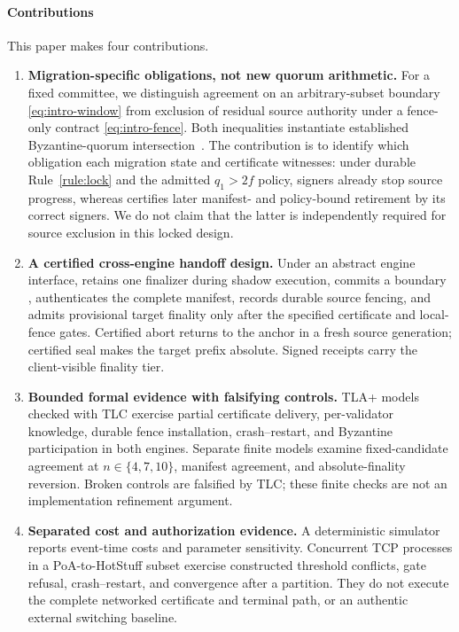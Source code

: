 \paragraph{Contributions}
This paper makes four contributions.
\begin{enumerate}[leftmargin=*,label=\textbf{C\arabic*.}]
  \item \textbf{Migration-specific obligations, not new quorum arithmetic.} For a fixed committee,
  we distinguish agreement on an arbitrary-subset boundary \eqref{eq:intro-window} from exclusion
  of residual source authority under a fence-only contract \eqref{eq:intro-fence}. Both inequalities
  instantiate established Byzantine-quorum intersection~\cite{byzantinequorums}. The contribution
  is to identify which obligation each migration state and certificate witnesses: under durable
  Rule~\ref{rule:lock} and the admitted $q_1>2f$ policy, \CutCert{} signers already stop source
  progress, whereas \FenceCert{} certifies later manifest- and policy-bound retirement by its
  correct signers. We do not claim that the latter is independently required for source exclusion
  in this locked design.
  \item \textbf{A certified cross-engine handoff design.} Under an abstract engine interface,
  \sage{} retains one finalizer during shadow execution, commits a boundary \CutCert{},
  authenticates the complete manifest, records durable source fencing, and admits provisional
  target finality only after the specified certificate and local-fence gates. Certified abort
  returns to the anchor in a fresh source generation; certified seal makes the target prefix
  absolute. Signed receipts carry the client-visible finality tier.
  \item \textbf{Bounded formal evidence with falsifying controls.} TLA+ models checked with TLC
  exercise partial certificate delivery, per-validator knowledge, durable fence installation,
  crash--restart, and Byzantine participation in both engines. Separate finite models examine
  fixed-candidate agreement at $n\in\{4,7,10\}$, manifest agreement, and absolute-finality
  reversion. Broken controls are falsified by TLC; these finite checks are not an implementation
  refinement argument.
  \item \textbf{Separated cost and authorization evidence.} A deterministic simulator reports
  event-time costs and parameter sensitivity. Concurrent TCP processes in a PoA-to-HotStuff
  subset exercise constructed threshold conflicts, gate refusal, crash--restart, and convergence
  after a partition. They do not execute the complete networked certificate and terminal path,
  or an authentic external switching baseline.
\end{enumerate}

